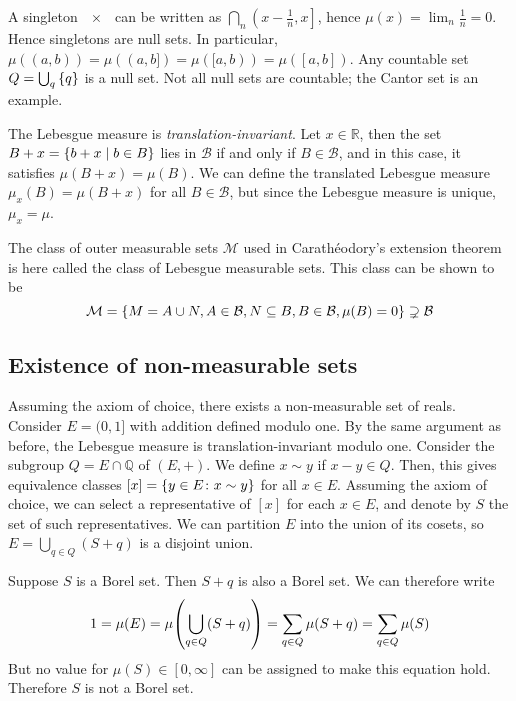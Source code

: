 \begin{remark}
	A singleton \( \qty{x} \) can be written as \( \bigcap_n \left(x-\frac 1n, x\right] \), hence \( \mu({x}) = \lim_n \frac 1n = 0 \).
	Hence singletons are null sets.
	In particular, \( \mu((a,b)) = \mu((a,b]) = \mu([a,b)) = \mu([a,b]) \).
	Any countable set \( Q = \bigcup_q \qty{q} \) is a null set.
	Not all null sets are countable; the Cantor set is an example.

	The Lebesgue measure is \emph{translation-invariant}.
	Let \( x \in \mathbb R \), then the set \( B + x = \qty{b + x \mid b \in B} \) lies in \( \mathcal B \) if and only if \( B \in \mathcal B \), and in this case, it satisfies \( \mu(B + x) = \mu(B) \).
	We can define the translated Lebesgue measure \( \mu_x(B) = \mu(B + x) \) for all \( B \in \mathcal B \), but since the Lebesgue measure is unique, \( \mu_x = \mu \).

	The class of outer measurable sets \( \mathcal M \) used in Carath\'eodory's extension theorem is here called the class of Lebesgue measurable sets.
	This class can be shown to be
	\[ \mathcal M = \qty{ M = A \cup N, A \in \mathcal B, N \subseteq B, B \in \mathcal B, \mu(B) = 0 } \supsetneq \mathcal B \]
\end{remark}

\subsection{Existence of non-measurable sets}
Assuming the axiom of choice, there exists a non-measurable set of reals.
Consider \( E = (0,1] \) with addition defined modulo one.
By the same argument as before, the Lebesgue measure is translation-invariant modulo one.
Consider the subgroup \( Q = E \cap \mathbb Q \) of \( (E, +) \).
We define \( x \sim y \) if \( x - y \in Q \).
Then, this gives equivalence classes \( [x] = \qty{y \in E \colon x \sim y} \) for all \( x \in E \).
Assuming the axiom of choice, we can select a representative of \( [x] \) for each \( x \in E \), and denote by \( S \) the set of such representatives.
We can partition \( E \) into the union of its cosets, so \( E = \bigcup_{q \in Q} (S + q) \) is a disjoint union.

Suppose \( S \) is a Borel set.
Then \( S + q \) is also a Borel set.
We can therefore write
\[ 1 = \mu(E) = \mu\qty(\bigcup_{q \in Q}(S+q)) = \sum_{q \in Q} \mu(S+q) = \sum_{q \in Q} \mu(S) \]
But no value for \( \mu(S) \in [0,\infty] \) can be assigned to make this equation hold.
Therefore \( S \) is not a Borel set.


